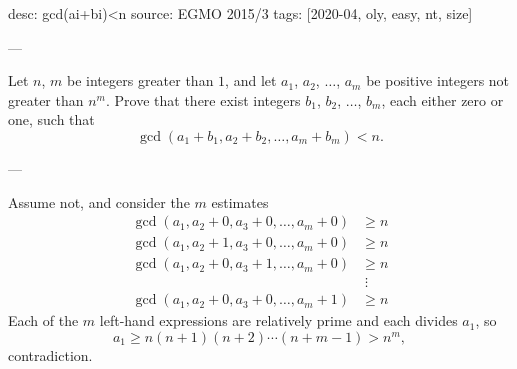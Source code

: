 desc: gcd(ai+bi)<n
source: EGMO 2015/3
tags: [2020-04, oly, easy, nt, size]

---

Let $n$, $m$ be integers greater than $1$, and let $a_1$, $a_2$, $\ldots$, $a_m$ be positive integers not greater than $n^m$. Prove that there exist integers $b_1$, $b_2$, $\ldots$, $b_m$, each either zero or one, such that \[\gcd(a_1+b_1,a_2+b_2,\ldots,a_m+b_m)<n.\]

---

Assume not, and consider the $m$ estimates
\begin{align*}
    \gcd(a_1,a_2+0,a_3+0,\ldots,a_m+0)&\ge n\\
    \gcd(a_1,a_2+1,a_3+0,\ldots,a_m+0)&\ge n\\
    \gcd(a_1,a_2+0,a_3+1,\ldots,a_m+0)&\ge n\\
    &\;\vdots\\
    \gcd(a_1,a_2+0,a_3+0,\ldots,a_m+1)&\ge n
\end{align*}
Each of the $m$ left-hand expressions are relatively prime and each divides $a_1$, so \[a_1\ge n(n+1)(n+2)\cdots(n+m-1)>n^m,\]
contradiction.
